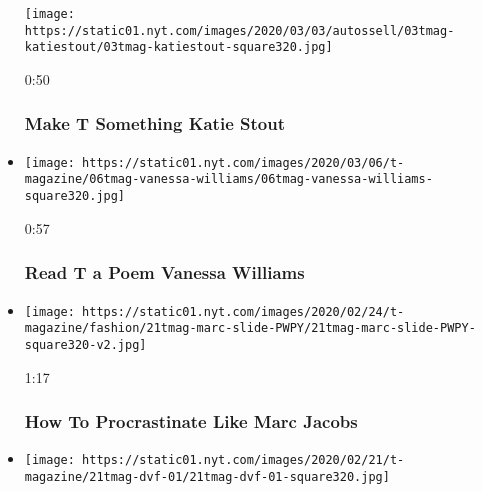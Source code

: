 \begin{itemize}
  \texttt{[image: https://static01.nyt.com/images/2020/03/03/autossell/03tmag-katiestout/03tmag-katiestout-square320.jpg]}

  0:50

  \hypertarget{make-t-something--katie-stout}{%
  \subsubsection{Make T Something \textbar{} Katie
  Stout}\label{make-t-something--katie-stout}}
\item
  \href{https://www.nytimes.com/video/t-magazine/100000007020348/vanessa-williams-maya-angelou.html?action=click\&module=video-series-bar\&region=header\&pgtype=Article\&playlistId=video/t-magazine}{}

  \texttt{[image: https://static01.nyt.com/images/2020/03/06/t-magazine/06tmag-vanessa-williams/06tmag-vanessa-williams-square320.jpg]}

  0:57

  \hypertarget{read-t-a-poem--vanessa-williams}{%
  \subsubsection{Read T a Poem \textbar{} Vanessa
  Williams}\label{read-t-a-poem--vanessa-williams}}
\item
  \href{https://www.nytimes.com/video/t-magazine/fashion/100000006992316/how-to-procrastinate-like-marc-jacobs.html?action=click\&module=video-series-bar\&region=header\&pgtype=Article\&playlistId=video/t-magazine}{}

  \texttt{[image: https://static01.nyt.com/images/2020/02/24/t-magazine/fashion/21tmag-marc-slide-PWPY/21tmag-marc-slide-PWPY-square320-v2.jpg]}

  1:17

  \hypertarget{how-to--procrastinate-like-marc-jacobs}{%
  \subsubsection{How To \textbar{} Procrastinate Like Marc
  Jacobs}\label{how-to--procrastinate-like-marc-jacobs}}
\item
  \href{https://www.nytimes.com/video/t-magazine/fashion/100000006990423/of-a-kind-diane-von-furstenburg.html?action=click\&module=video-series-bar\&region=header\&pgtype=Article\&playlistId=video/t-magazine}{}

  \texttt{[image: https://static01.nyt.com/images/2020/02/21/t-magazine/21tmag-dvf-01/21tmag-dvf-01-square320.jpg]}


\end{itemize}
